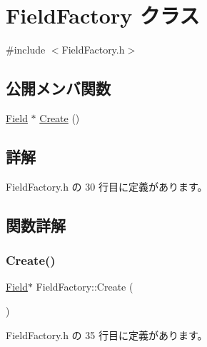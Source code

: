 \hypertarget{class_field_factory}{}\section{Field\+Factory クラス}
\label{class_field_factory}


{\ttfamily \#include $<$Field\+Factory.\+h$>$}

\subsection*{公開メンバ関数}
\begin{DoxyCompactItemize}
\item 
\mbox{\hyperlink{class_field}{Field}} $\ast$ \mbox{\hyperlink{class_field_factory_a7e2a9847756bbb43f9942a219cc69125}{Create}} ()
\end{DoxyCompactItemize}


\subsection{詳解}


 Field\+Factory.\+h の 30 行目に定義があります。



\subsection{関数詳解}
\mbox{\label{class_field_factory_a7e2a9847756bbb43f9942a219cc69125}} 
\subsubsection{\texorpdfstring{Create()}{Create()}}
{\footnotesize\ttfamily \mbox{\hyperlink{class_field}{Field}}$\ast$ Field\+Factory\+::\+Create (\begin{DoxyParamCaption}{ }\end{DoxyParamCaption})\hspace{0.3cm}{\ttfamily [inline]}}



 Field\+Factory.\+h の 35 行目に定義があります。

